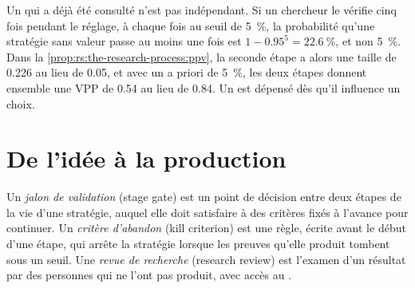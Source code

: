 Un  qui a déjà été consulté n'est pas indépendant. Si un chercheur le vérifie cinq fois pendant le réglage, à chaque fois au seuil de 5~\%,
la probabilité qu'une stratégie sans valeur passe au moins une fois est $1 - 0.95^5 = 22.6~\%$, et non 5~\%. Dans la
\cref{prop:rs:the-research-process:ppv}, la seconde étape a alors une taille de 0.226 au lieu de 0.05, et avec un a priori de 5~\%, les deux
étapes donnent ensemble une VPP de 0.54 au lieu de 0.84. Un  est dépensé dès qu'il influence un choix.

\section{De l'idée à la production}

\begin{definition}\label{def:rs:the-research-process:gate}
Un \emph{jalon de validation} (stage gate) est un point de décision entre deux étapes de la vie d'une stratégie, auquel elle doit satisfaire à des
critères fixés à l'avance pour continuer. Un \emph{critère d'abandon} (kill criterion) est une règle, écrite avant le début d'une étape,
qui arrête la stratégie lorsque les preuves qu'elle produit tombent sous un seuil. Une \emph{revue de recherche} (research review)
est l'examen d'un résultat par des personnes qui ne l'ont pas produit, avec accès au .
\end{definition}

